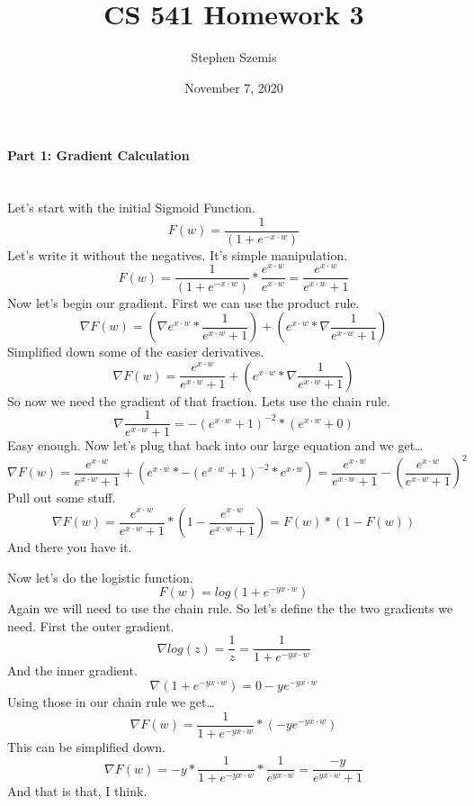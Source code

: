 \documentclass[12pt]{article}
\begin{document}
    \title{CS 541 Homework 3}
    \author{Stephen Szemis}
    \date{November 7, 2020}
    \maketitle

    \paragraph{Part 1: Gradient Calculation}~\\
    Let's start with the initial Sigmoid Function.
    \[
        F(w) = \frac{1}{(1 + e^{-x \cdot w})}
    \]
    Let's write it without the negatives. It's simple manipulation.
    \[
        F(w) = \frac{1}{(1 + e^{-x \cdot w})} * 
        \frac{e^{x \cdot w}}{e^{x \cdot w}} = 
        \frac{e^{x \cdot w}}{e^{x \cdot w} + 1}
    \]
    Now let's begin our gradient. First we can use the product rule.
    \[
        \nabla F(w) = 
        ( \nabla e^{x \cdot w} * \frac{1}{e^{x \cdot w} + 1} )
        + ( e^{x \cdot w} * \nabla \frac{1}{e^{x \cdot w} + 1} )
    \]
    Simplified down some of the easier derivatives.
    \[
        \nabla F(w) = 
        \frac{e^{x \cdot w}}{e^{x \cdot w} + 1}
        + ( e^{x \cdot w} * \nabla \frac{1}{e^{x \cdot w} + 1} )
    \]
    So now we need the gradient of that fraction. Lets use the chain rule.
    \[
        \nabla \frac{1}{e^{x \cdot w} + 1} =
        -(e^{x \cdot w} + 1)^{-2} * (e^{x \cdot w} + 0)
    \]
    Easy enough. Now let's plug that back into our large equation and we get\dots
    \[
        \nabla F(w) = 
        \frac{e^{x \cdot w}}{e^{x \cdot w} + 1} +
        ( e^{x \cdot w} * -(e^{x \cdot w} + 1)^{-2} * e^{x \cdot w} ) =
        \frac{e^{x \cdot w}}{e^{x \cdot w} + 1} -
        (\frac{e^{x \cdot w}}{e^{x \cdot w} + 1})^{2}
    \]
    Pull out some stuff.
    \[
        \nabla F(w) =
        \frac{e^{x \cdot w}}{e^{x \cdot w} + 1} *
        ( 1 - \frac{e^{x \cdot w}}{e^{x \cdot w} + 1}) =
        F(w) * (1 - F(w))
    \]
    And there you have it.

    \noindent Now let's do the logistic function.
    \[
        F(w) = log(1 + e^{-yx \cdot w})
    \]
    Again we will need to use the chain rule. So let's define the the two gradients we need.
    First the outer gradient.
    \[
        \nabla log(z) = \frac{1}{z} = \frac{1}{1 + e^{-yx \cdot w}}
    \]
    And the inner gradient.
    \[
        \nabla (1 + e^{-yx \cdot w}) = 0 - ye^{-yx \cdot w}
    \]
    Using those in our chain rule we get\dots
    \[
        \nabla F(w) = \frac{1}{1 + e^{-yx \cdot w}} * (-ye^{-yx \cdot w})
    \]
    This can be simplified down.
    \[
        \nabla F(w) = 
        -y * \frac{1}{1 + e^{-yx \cdot w}} * \frac{1}{e^{yx \cdot w}} =
        \frac{-y}{e^{yx \cdot w} + 1}
    \]
    And that is that, I think.
\end{document}
